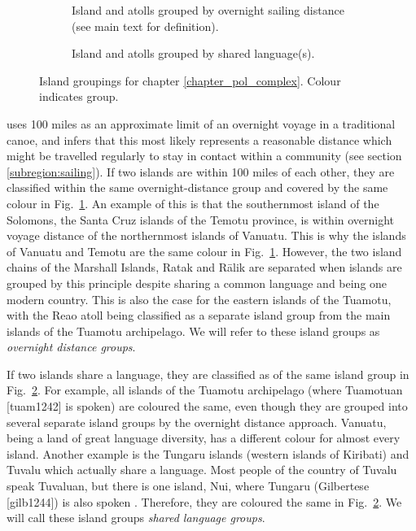 \documentclass[a4paper,10pt]{article} %
\begin{document}

\begin{figure}[H]
\centering
    \begin{subfigure}{\textwidth}
     \caption{Island and atolls grouped by overnight sailing distance (see main text for definition).}
\label{marck_group_map}
    \end{subfigure}

    \begin{subfigure}{\textwidth}
\caption{Island and atolls grouped by shared language(s).}
\label{medium_group_map}
    \end{subfigure}
\caption{{Island groupings for chapter \ref{chapter_pol_complex}. Colour indicates group.}}
    \label{fig:island_groups}
    \end{figure}
    
\citet{mark_1986, marck2000} uses 100 miles as an approximate limit of an overnight voyage in a traditional canoe, and infers that this most likely represents a reasonable distance which might be travelled regularly to stay in contact within a community (see section \ref{subregion:sailing}). If two islands are within 100 miles of each other, they are classified within the same overnight-distance group and covered by the same colour in Fig.~\ref{marck_group_map}. An example of this is that the southernmost island of the Solomons, the Santa Cruz islands of the Temotu province, is within overnight voyage distance of the northernmost islands of Vanuatu. This is why the islands of Vanuatu and Temotu are the same colour in Fig.~\ref{marck_group_map}. However, the two island chains of the Marshall Islands, Ratak and R\={a}lik are separated when islands are grouped by this principle despite sharing a common language and being one modern country. This is also the case for the eastern islands of the Tuamotu, with the Reao atoll being classified as a separate island group from the main islands of the Tuamotu archipelago. We will refer to these island groups as \textit{overnight distance groups}. 

If two islands share a language, they are classified as of the same island group in Fig.~\ref{medium_group_map}. For example, all islands of the Tuamotu archipelago (where Tuamotuan [tuam1242] is spoken) are coloured the same, even though they are grouped into several separate island groups by the overnight distance approach. Vanuatu, being a land of great language diversity, has a different colour for almost every island. Another example is the Tungaru islands (western islands of Kiribati) and Tuvalu which actually share a language. Most people of the country of Tuvalu speak Tuvaluan, but there is one island, Nui, where Tungaru (Gilbertese [gilb1244]) is also spoken \citep{faaniu1983tuvalu, macdonald_2020, omniglot_tuvaluan}. Therefore, they are coloured the same in Fig.~\ref{medium_group_map}. We will call these island groups \textit{shared language groups}.
\end{document}
